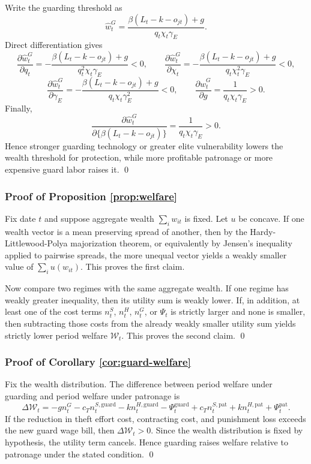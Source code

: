 Write the guarding threshold as
\[
\widehat{w}^{G}_t
=
\frac{\beta(L_t-k-o_{jt}) + g}{q_t \chi_t \gamma_E}.
\]
Direct differentiation gives
\[
\frac{\partial \widehat{w}^{G}_t}{\partial q_t}
=
-\frac{\beta(L_t-k-o_{jt}) + g}{q_t^2 \chi_t \gamma_E} < 0,
\qquad
\frac{\partial \widehat{w}^{G}_t}{\partial \chi_t}
=
-\frac{\beta(L_t-k-o_{jt}) + g}{q_t \chi_t^2 \gamma_E} < 0,
\]
\[
\frac{\partial \widehat{w}^{G}_t}{\partial \gamma_E}
=
-\frac{\beta(L_t-k-o_{jt}) + g}{q_t \chi_t \gamma_E^2} < 0,
\qquad
\frac{\partial \widehat{w}^{G}_t}{\partial g}
=
\frac{1}{q_t \chi_t \gamma_E} > 0.
\]
Finally,
\[
\frac{\partial \widehat{w}^{G}_t}{\partial \{\beta(L_t-k-o_{jt})\}}
=
\frac{1}{q_t \chi_t \gamma_E} > 0.
\]
Hence stronger guarding technology or greater elite vulnerability lowers the wealth threshold for protection, while more profitable patronage or more expensive guard labor raises it. \qed

\subsubsection*{Proof of Proposition \ref{prop:welfare}}

Fix date $t$ and suppose aggregate wealth $\sum_i w_{it}$ is fixed. Let $u$ be concave. If one wealth vector is a mean preserving spread of another, then by the Hardy-Littlewood-Polya majorization theorem, or equivalently by Jensen's inequality applied to pairwise spreads, the more unequal vector yields a weakly smaller value of $\sum_i u(w_{it})$. This proves the first claim.

Now compare two regimes with the same aggregate wealth. If one regime has weakly greater inequality, then its utility sum is weakly lower. If, in addition, at least one of the cost terms $n_t^{S}$, $n_t^{H}$, $n_t^{G}$, or $\Psi_t$ is strictly larger and none is smaller, then subtracting those costs from the already weakly smaller utility sum yields strictly lower period welfare $\mathcal{W}_t$. This proves the second claim. \qed

\subsubsection*{Proof of Corollary \ref{cor:guard-welfare}}

Fix the wealth distribution. The difference between period welfare under guarding and period welfare under patronage is
\[
\Delta \mathcal{W}_t
=
- g n_t^{G}
- c_T n_t^{S,\mathrm{guard}}
- k n_t^{H,\mathrm{guard}}
- \Psi_t^{\mathrm{guard}}
+ c_T n_t^{S,\mathrm{pat}}
+ k n_t^{H,\mathrm{pat}}
+ \Psi_t^{\mathrm{pat}}.
\]
If the reduction in theft effort cost, contracting cost, and punishment loss exceeds the new guard wage bill, then $\Delta \mathcal{W}_t > 0$. Since the wealth distribution is fixed by hypothesis, the utility term cancels. Hence guarding raises welfare relative to patronage under the stated condition. \qed

